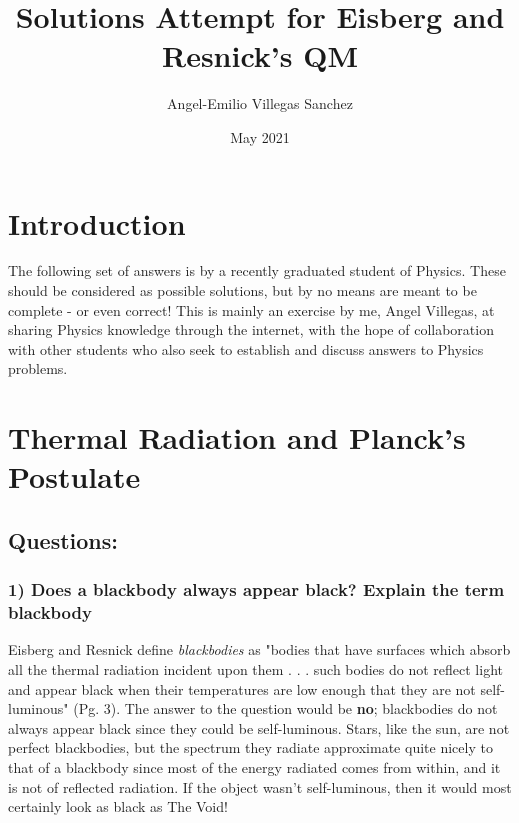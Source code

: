 \documentclass[12pt]{report}
\title{Solutions Attempt for Eisberg and Resnick's QM}
\author{Angel-Emilio Villegas Sanchez}
\date{May 2021}
\begin{document}
\maketitle
\chapter*{Introduction}
The following set of answers is by a recently graduated student of Physics. These should be considered as possible  solutions, but by no means are meant to be complete - or even correct! This is mainly an exercise by me, Angel Villegas, at sharing Physics knowledge through the internet, with the hope of collaboration with other students who also seek to establish and discuss answers to Physics problems.   
\chapter{Thermal Radiation and Planck's Postulate}

\section*{Questions:}
\subsection*{1) Does a blackbody always appear black? Explain the term blackbody}
Eisberg and Resnick define \textit{blackbodies} as "bodies that have surfaces which absorb all the thermal radiation incident upon them . . . such bodies do not reflect light and appear black when their temperatures are low enough that they are not self-luminous" (Pg. 3). The answer to the question would be \textbf{no}; blackbodies do not always appear black since they could be self-luminous. Stars, like the sun, are not perfect blackbodies, but the spectrum they radiate approximate quite nicely to that of a blackbody since most of the energy radiated comes from within, and it is not of reflected radiation. If the object wasn't self-luminous, then it would most certainly look as black as The Void!
\end{document}
